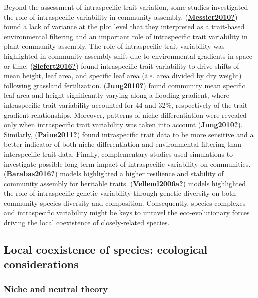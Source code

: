 \documentclass[12pt,twoside,a4paper, a]{article}
\begin{document}
Beyond the assessment of intraspecific trait variation, some studies investigated the role of intraspecific variability in community assembly.
(\protect\hyperlink{ref-Messier2010}{\textbf{Messier2010?}}) found a lack of variance at the plot level that they interpreted as a trait-based environmental filtering and an important role of intraspecific trait variability in plant community assembly.
The role of intraspecific trait variability was highlighted in community assembly shift due to environmental gradients in space or time.
(\protect\hyperlink{ref-Siefert2016}{\textbf{Siefert2016?}}) found intraspecific trait variability to drive shifts of mean height, leaf area, and specific leaf area (\emph{i.e.} area divided by dry weight) following grassland fertilization.
(\protect\hyperlink{ref-Jung2010}{\textbf{Jung2010?}}) found community mean specific leaf area and height significantly varying along a flooding gradient, where intraspecific trait variability accounted for 44 and 32\%, respectively of the trait-gradient relationships.
Moreover, patterns of niche differentiation were revealed only when intraspecific trait variability was taken into account (\protect\hyperlink{ref-Jung2010}{\textbf{Jung2010?}}). Similarly, (\protect\hyperlink{ref-Paine2011}{\textbf{Paine2011?}}) found intraspecific trait data to be more sensitive and a better indicator of both niche differentiation and environmental filtering than interspecific trait data.
Finally, complementary studies used simulations to investigate possible long term impact of intraspecific variability on communities. (\protect\hyperlink{ref-Barabas2016}{\textbf{Barabas2016?}}) models highlighted a higher resilience and stability of community assembly for heritable traits.
(\protect\hyperlink{ref-Vellend2006a}{\textbf{Vellend2006a?}}) models highlighted the role of intraspecific genetic variability through genetic diversity on both community species diversity and composition.
Consequently, species complexes and intraspecific variability might be keys to unravel the eco-evolutionary forces driving the local coexistence of closely-related species.

\hypertarget{local-coexistence-of-species-ecological-considerations}{%
\subsection{Local coexistence of species: ecological considerations}\label{local-coexistence-of-species-ecological-considerations}}

\hypertarget{niche-and-neutral-theory}{%
\subsubsection{Niche and neutral theory}\label{niche-and-neutral-theory}}
\end{document}
